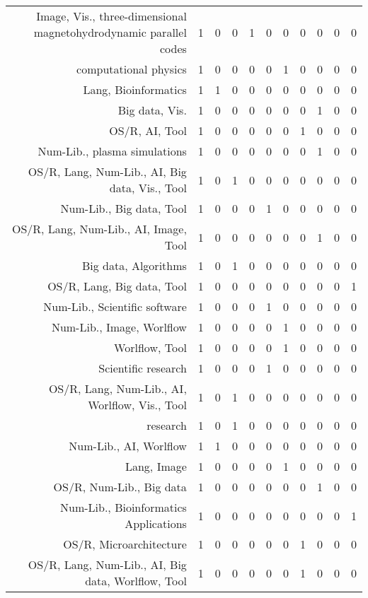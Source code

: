 {\begin{landscape}
\begin{longtable}[htb]{r|c|c|c|c|c|c|c|c|c|c}
{Image, Vis., three-dimensional magnetohydrodynamic parallel codes} & 1 & 0 & 0 & 1 & 0 & 0 & 0 & 0 & 0 & 0 \\%
{computational physics} & 1 & 0 & 0 & 0 & 0 & 1 & 0 & 0 & 0 & 0 \\%
{Lang, Bioinformatics} & 1 & 1 & 0 & 0 & 0 & 0 & 0 & 0 & 0 & 0 \\%
{Big data, Vis.} & 1 & 0 & 0 & 0 & 0 & 0 & 0 & 1 & 0 & 0 \\%
{OS/R, AI, Tool} & 1 & 0 & 0 & 0 & 0 & 0 & 1 & 0 & 0 & 0 \\%
{Num-Lib., plasma simulations} & 1 & 0 & 0 & 0 & 0 & 0 & 0 & 1 & 0 & 0 \\%
{OS/R, Lang, Num-Lib., AI, Big data, Vis., Tool} & 1 & 0 & 1 & 0 & 0 & 0 & 0 & 0 & 0 & 0 \\%
{Num-Lib., Big data, Tool} & 1 & 0 & 0 & 0 & 1 & 0 & 0 & 0 & 0 & 0 \\%
{OS/R, Lang, Num-Lib., AI, Image, Tool} & 1 & 0 & 0 & 0 & 0 & 0 & 0 & 1 & 0 & 0 \\%
{Big data, Algorithms} & 1 & 0 & 1 & 0 & 0 & 0 & 0 & 0 & 0 & 0 \\%
{OS/R, Lang, Big data, Tool} & 1 & 0 & 0 & 0 & 0 & 0 & 0 & 0 & 0 & 1 \\%
{Num-Lib., Scientific software} & 1 & 0 & 0 & 0 & 1 & 0 & 0 & 0 & 0 & 0 \\%
{Num-Lib., Image, Worlflow} & 1 & 0 & 0 & 0 & 0 & 1 & 0 & 0 & 0 & 0 \\%
{Worlflow, Tool} & 1 & 0 & 0 & 0 & 0 & 1 & 0 & 0 & 0 & 0 \\%
{Scientific research} & 1 & 0 & 0 & 0 & 1 & 0 & 0 & 0 & 0 & 0 \\%
{OS/R, Lang, Num-Lib., AI, Worlflow, Vis., Tool} & 1 & 0 & 1 & 0 & 0 & 0 & 0 & 0 & 0 & 0 \\%
{research} & 1 & 0 & 1 & 0 & 0 & 0 & 0 & 0 & 0 & 0 \\%
{Num-Lib., AI, Worlflow} & 1 & 1 & 0 & 0 & 0 & 0 & 0 & 0 & 0 & 0 \\%
{Lang, Image} & 1 & 0 & 0 & 0 & 0 & 1 & 0 & 0 & 0 & 0 \\%
{OS/R, Num-Lib., Big data} & 1 & 0 & 0 & 0 & 0 & 0 & 0 & 1 & 0 & 0 \\%
{Num-Lib., Bioinformatics Applications} & 1 & 0 & 0 & 0 & 0 & 0 & 0 & 0 & 0 & 1 \\%
{OS/R, Microarchitecture} & 1 & 0 & 0 & 0 & 0 & 0 & 1 & 0 & 0 & 0 \\%
{OS/R, Lang, Num-Lib., AI, Big data, Worlflow, Tool} & 1 & 0 & 0 & 0 & 0 & 0 & 1 & 0 & 0 & 0 \\%

\end{longtable}
\end{landscape}}
